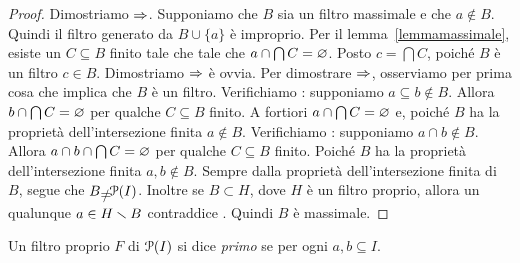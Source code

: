 \begin{proof}
Dimostriamo $\IMP$. Supponiamo che $B$ sia un filtro massimale e che $a\notin B$. Quindi il filtro generato da $B\cup\{a\}$ \`e improprio. Per il lemma~\ref{lemmamassimale}, esiste un $C\subseteq B$ finito tale che tale che $a\cap\bigcap C=\0$. Posto $c=\bigcap C$, poich\'e $B$ \`e un filtro $c\in B$. Dimostriamo $\IMP$ \`e ovvia. Per dimostrare $\IMP$, osserviamo per prima cosa che  implica che  $B$ \`e un filtro. Verifichiamo : supponiamo $a\subseteq b\notin B$. Allora $b\cap \bigcap C=\0$ per qualche $C\subseteq B$ finito. A fortiori $a\cap \bigcap C =\0$ e, poich\'e $B$ ha la propriet\`a dell'intersezione finita $a\notin B$. Verifichiamo : supponiamo $a\cap  b\notin B$. Allora $a\cap  b\cap   \bigcap C=\0$ per qualche $C\subseteq B$ finito. Poich\'e $B$ ha la propriet\`a dell'intersezione finita $a,b\notin B$. Sempre dalla propriet\`a dell'intersezione finita di $B$, segue che $B\neq \P(I)$.  Inoltre se $B\subset H$, dove $H$ \`e un filtro proprio, allora un qualunque $a\in H\sm B$ contraddice . Quindi $B$ \`e massimale.
\end{proof}

Un filtro proprio $F$ di $\P(I)$ si dice \emph{primo\/} se per ogni $a,b\subseteq I$.

